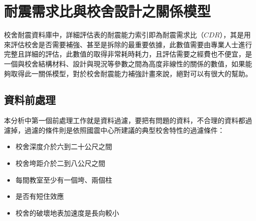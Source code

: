 \section{耐震需求比與校舍設計之關係模型}

校舍耐震資料庫中，詳細評估表的耐震能力索引即為耐震需求比（$CDR$），其是用來評估校舍是否需要補強、甚至是拆除的最重要依據，此數值需要由專業人士進行完整且詳細的評估，此數值的取得非常耗時耗力，且評估需要之經費也不便宜，是一個與校舍結構材料、設計與現況等參數之間為高度非線性的關係的數值，如果能夠取得此一關係模型，對於校舍耐震能力補強計畫來說，絕對可以有很大的幫助。

\subsection{資料前處理}

本分析中第一個前處理工作就是資料過濾，要把有問題的資料，不合理的資料都過濾掉，過濾的條件則是依照國震中心所建議的典型校舍特性的過濾條件：


\begin{itemize}
\item 校舍深度介於六到二十公尺之間
\item 校舍垮距介於二到八公尺之間
\item 每間教室至少有一個垮、兩個柱
\item 是否有短住效應 %
\item 校舍的破壞地表加速度是長向較小
\end{itemize}


